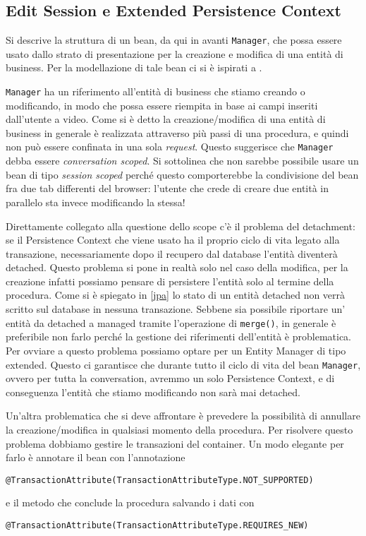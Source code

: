 \subsection{Edit Session e Extended Persistence Context}
Si descrive la struttura di un bean, da qui in avanti \texttt{Manager}, che possa essere usato dallo strato di presentazione per la creazione e modifica di una entità di business.
Per la modellazione di tale bean ci si è ispirati a \cite{jpa}.

\texttt{Manager} ha un riferimento all'entità di business che stiamo creando o modificando, in modo che possa essere riempita in base ai campi inseriti dall'utente a video.
Come si è detto la creazione/modifica di una entità di business in generale è realizzata attraverso più passi di una procedura, e quindi non può essere confinata in una sola \textsl{request}. Questo suggerisce che \texttt{Manager} debba essere 
\textsl{conversation scoped}. Si sottolinea che non sarebbe possibile usare un bean di tipo \textsl{session scoped} perché questo comporterebbe la condivisione del bean fra due tab differenti del browser: l'utente che crede di creare due entità in parallelo
sta invece modificando la stessa!

Direttamente collegato alla questione dello scope c'è il problema del detachment: se il Persistence Context che viene usato ha il proprio ciclo di vita legato alla transazione, necessariamente dopo il recupero dal database l'entità diventerà
detached. Questo problema si pone in realtà solo nel caso della modifica, per la creazione infatti possiamo pensare di persistere l'entità solo al termine della procedura. Come si è spiegato in \ref{jpa} lo stato di un entità detached non verrà scritto sul database in nessuna transazione.
Sebbene sia possibile riportare un' entità da detached a managed tramite
l'operazione di \texttt{merge()}, in generale è preferibile non farlo perché la gestione dei riferimenti dell'entità è problematica. Per ovviare a questo problema possiamo optare per un Entity Manager di tipo extended. Questo ci garantisce
che durante tutto il ciclo di vita del bean \texttt{Manager}, ovvero per tutta la conversation, avremmo un solo Persistence Context, e di conseguenza l'entità che stiamo modificando non sarà mai detached.

Un'altra problematica che si deve affrontare è prevedere la possibilità di annullare la creazione/modifica in qualsiasi momento della procedura. Per risolvere questo problema dobbiamo gestire le transazioni del container.
Un modo elegante per farlo è annotare il bean con l'annotazione 
\begin{lstlisting} 
@TransactionAttribute(TransactionAttributeType.NOT_SUPPORTED)
\end{lstlisting}
e il metodo che conclude la procedura salvando i dati con 
\begin{lstlisting}
@TransactionAttribute(TransactionAttributeType.REQUIRES_NEW)
\end{lstlisting}



